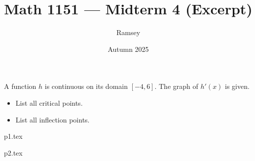 \documentclass{ximera}
\title{Math 1151 — Midterm 4 (Excerpt)}
\author{Ramsey}
\date{Autumn 2025}
\begin{document}
\maketitle

\begin{examproblems}

\begin{examproblem}
A function $h$ is continuous on its domain $[-4,6]$.
The graph of $h'(x)$ is given.
\begin{itemize}
  \item List all critical points.
  \item List all inflection points.
\end{itemize}
\end{examproblem}

\begin{addexamproblem}{p1.tex}
\end{addexamproblem}

\begin{addexamproblem}{p2.tex}
\end{addexamproblem}

\end{examproblems}
\end{document}
